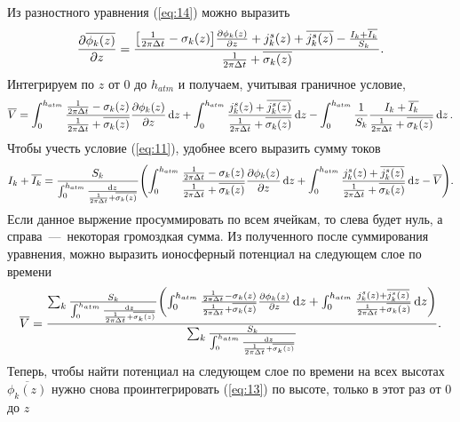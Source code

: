 \documentclass[12pt]{article}
\begin{document}
	Из разностного уравнения (\ref{eq:14}) можно выразить
	\begin{equation}\label{eq:13}
			\pdv{\overline{\phi_k(z)}}{z} = \dfrac{\qty[\frac{1}{2\pi \Delta t} - \sigma_k(z)]\pdv{\phi_k(z)}{z} + j^s_k (z) + \overline{j^s_k (z)} - \frac{I_k + \overline{I_k}}{S_k}}{\frac{1}{2\pi \Delta t} + \overline{\sigma_k(z)}}.
	\end{equation}
	Интегрируем по $z$ от $0$ до $h_{atm}$ и получаем, учитывая граничное условие,
	\begin{equation}
		\overline{V} = \int_{0}^{h_{atm}} \dfrac{\frac{1}{2\pi \Delta t} - \sigma_k(z)}{\frac{1}{2\pi \Delta t} + \overline{\sigma_k(z)}} \pdv{\phi_k(z)}{z} \dd{z} + \int_{0}^{h_{atm}} \dfrac{j^s_k (z) + \overline{j^s_k (z)}}{\frac{1}{2\pi \Delta t} + \overline{\sigma_k(z)}} \dd{z} - \int_{0}^{h_{atm}} \dfrac{1}{S_k} \dfrac{I_k + \overline{I_k}}{\frac{1}{2\pi \Delta t} + \overline{\sigma_k(z)}} \dd{z}.
	\end{equation}
	Чтобы учесть условие (\ref{eq:11}), удобнее всего выразить сумму токов
	\begin{equation}\label{eq:15}
		I_k + \overline{I_k} = \dfrac{S_k}{\int_{0}^{h_{atm}} \frac{\dd{z}}{\frac{1}{2\pi \Delta t} + \overline{\sigma_k(z)}}} \qty(\int_{0}^{h_{atm}} \dfrac{\frac{1}{2\pi \Delta t} - \sigma_k(z)}{\frac{1}{2\pi \Delta t} + \overline{\sigma_k(z)}} \pdv{\phi_k(z)}{z} \dd{z} + \int_{0}^{h_{atm}} \dfrac{j^s_k (z) + \overline{j^s_k (z)}}{\frac{1}{2\pi \Delta t} + \overline{\sigma_k(z)}} \dd{z} - \overline{V}).
	\end{equation}
	Если данное выржение просуммировать по всем ячейкам, то слева будет нуль, а справа~---~некоторая громоздкая сумма. Из полученного после суммирования уравнения, можно выразить ионосферный потенциал на следующем слое по времени
	\begin{equation}\label{eq:16}
		\overline{V} = \dfrac{\sum_k \frac{S_k}{\int_{0}^{h_{atm}} \frac{\dd{z}}{\frac{1}{2\pi \Delta t} + \overline{\sigma_k(z)}}} \qty(\int_{0}^{h_{atm}} \frac{\frac{1}{2\pi \Delta t} - \sigma_k(z)}{\frac{1}{2\pi \Delta t} + \overline{\sigma_k(z)}} \pdv{\phi_k(z)}{z} \dd{z} + \int_{0}^{h_{atm}} \frac{j^s_k (z) + \overline{j^s_k (z)}}{\frac{1}{2\pi \Delta t} + \overline{\sigma_k(z)}} \dd{z})}{\sum_k \frac{S_k}{\int_{0}^{h_{atm}} \frac{\dd{z}}{\frac{1}{2\pi \Delta t} + \overline{\sigma_k(z)}}}}.
	\end{equation}
	Теперь, чтобы найти потенциал на следующем слое по времени на всех высотах $\overline{\phi_k(z)}$ нужно снова проинтегрировать (\ref{eq:13}) по высоте, только в этот раз от $0$ до $z$
\end{document}

